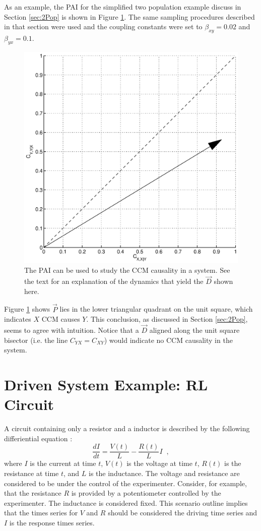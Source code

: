 \documentclass[a4paper,11pt]{article}
\begin{document}
As an example, the PAI for the simplified two population example discuss in Section \ref{sec:2Pop} is shown in Figure \ref{fig:}.  The same sampling procedures described in that section were used and the coupling constants were set to $\beta_{xy}=0.02$ and $\beta_{yx}=0.1$.
\begin{figure}[ht]
\label{fig:}
\includegraphics[scale=0.45]{Figure3.eps}
\caption{The PAI can be used to study the CCM causality in a system.  See the text for an explanation of the dynamics that yield the $\vec{D}$ shown here.}
\end{figure}
Figure \ref{fig:} shows $\vec{P}$ lies in the lower triangular quadrant on the unit square, which indicates $X$ CCM causes $Y$.  This conclusion, as discussed in Section \ref{sec:2Pop}, seems to agree with intuition.  Notice that a $\vec{D}$ aligned along the unit square bisector (i.e. the line $C_{YX}=C_{XY}$) would indicate no CCM causality in the system.

\section{Driven System Example: RL Circuit}
A circuit containing only a resistor and a inductor is described by the following differiential equation \cite{halliday2013}:
\begin{equation}
\label{eqn:it}
\frac{dI}{dt} = \frac{V(t)}{L} - \frac{R(t)}{L} I\;\;,
\end{equation}
where $I$ is the current at time $t$, $V(t)$ is the voltage at time $t$, $R(t)$ is the resistance at time $t$, and $L$ is the inductance.  The voltage and resistance are considered to be under the control of the experimenter.  Consider, for example, that the resistance $R$ is provided by a potentiometer controlled by the experimenter.  The inductance is considered fixed.  This scenario outline implies that the times series for $V$ and $R$ should be considered the driving time series and $I$ is the response times series.  
\end{document}
